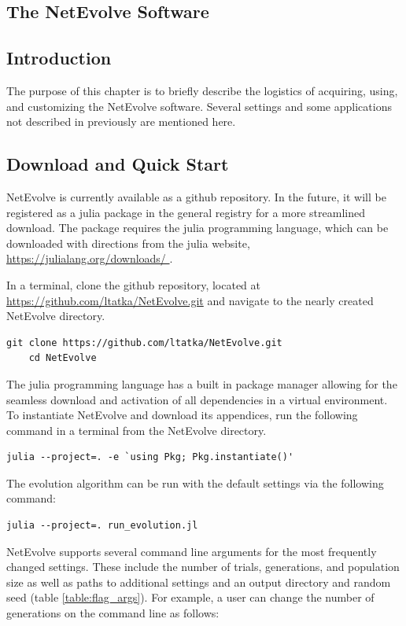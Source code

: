 \documentclass[12pt]{report}
\begin{document}
\begin{appendices}	
\chapter{The NetEvolve Software}

\section{Introduction}
The purpose of this chapter is to briefly describe the logistics of acquiring, using, and customizing the NetEvolve software. Several settings and some applications not described in previously are mentioned here.

\section{Download and Quick Start}
NetEvolve is currently available as a github repository. In the future, it will be registered as a julia package in the general registry for a more streamlined download. The package requires the julia programming language, which can be downloaded with directions from the julia website, \url{https://julialang.org/downloads/ }.

In a terminal, clone the github repository, located at \url{https://github.com/ltatka/NetEvolve.git} and navigate to the nearly created NetEvolve directory.


\begin{Verbatim}[frame=single]
	git clone https://github.com/ltatka/NetEvolve.git
	cd NetEvolve
\end{Verbatim}
The julia programming language has a built in package manager allowing for the seamless download and activation of all dependencies in a virtual environment. To instantiate NetEvolve and download its appendices, run the following command in a terminal from the NetEvolve directory.
\begin{Verbatim}[frame=single]
	julia --project=. -e `using Pkg; Pkg.instantiate()'
\end{Verbatim}

The evolution algorithm can be run with the default settings via the following command:
\begin{Verbatim}[frame=single]
	julia --project=. run_evolution.jl
\end{Verbatim}

NetEvolve supports several command line arguments for the most frequently changed settings. These include the number of trials, generations, and population size as well as paths to additional settings and an output directory and random seed (table \ref{table:flag_args}). For example, a user can change the number of generations on the command line as follows:



\end{appendices}
\end{document}

